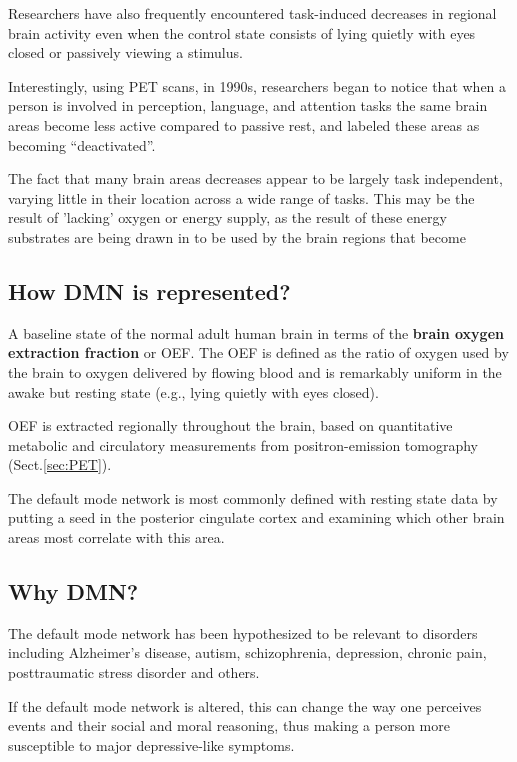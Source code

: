 Researchers have also frequently encountered task-induced decreases in regional
brain activity even when the control state consists of lying quietly with eyes
closed or passively viewing a stimulus.

Interestingly, using PET scans, in 1990s, researchers began to notice that when a person
is involved in perception, language, and attention tasks the same brain areas
become less active compared to passive rest, and labeled these areas as becoming
“deactivated”.

The fact that many brain areas decreases appear to be largely task independent,
varying little in their location across a wide range of tasks. This may be the result of 'lacking' oxygen or energy supply,
as the result of these energy substrates are being drawn in to be used by the brain regions that become


\subsection{How DMN is represented?}

A baseline state of the normal adult human brain in terms of the {\bf brain oxygen
extraction fraction} or OEF. The OEF is defined as the ratio of oxygen used by
the brain to oxygen delivered by flowing blood and is remarkably uniform in the
awake but resting state (e.g., lying quietly with eyes closed).

OEF is extracted regionally throughout the brain, based on quantitative
metabolic and circulatory measurements from positron-emission tomography (Sect.\ref{sec:PET}).


The default mode network is most commonly defined with resting state data by
putting a seed in the posterior cingulate cortex and examining which other brain
areas most correlate with this area.





\subsection{Why DMN?}

The default mode network has been hypothesized to be relevant to disorders
including Alzheimer's disease, autism, schizophrenia, depression, chronic pain,
posttraumatic stress disorder and others.

If the default mode network is altered, this can change the way one perceives
events and their social and moral reasoning, thus making a person more
susceptible to major depressive-like symptoms.


